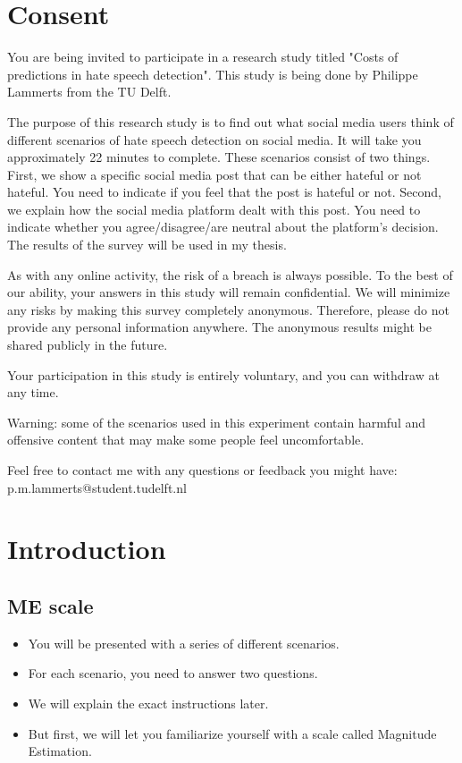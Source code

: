 \section{Consent}
\begin{flushleft}
    You are being invited to participate in a research study titled "Costs of predictions in hate speech detection". This study is being done by Philippe Lammerts from the TU Delft.
\end{flushleft}
\begin{flushleft}
    The purpose of this research study is to find out what social media users think of different scenarios of hate speech detection on social media. It will take you approximately 22 minutes to complete. These scenarios consist of two things. First, we show a specific social media post that can be either hateful or not hateful. You need to indicate if you feel that the post is hateful or not. Second,  we explain how the social media platform dealt with this post. You need to indicate whether you agree/disagree/are neutral about the platform's decision. The results of the survey will be used in my thesis.
\end{flushleft}
\begin{flushleft}
    As with any online activity, the risk of a breach is always possible. To the best of our ability, your answers in this study will remain confidential. We will minimize any risks by making this survey completely anonymous. Therefore, please do not provide any personal information anywhere. The anonymous results might be shared publicly in the future.
\end{flushleft}
\begin{flushleft}
    Your participation in this study is entirely voluntary, and you can withdraw at any time.
\end{flushleft}
\begin{flushleft}
    Warning: some of the scenarios used in this experiment contain harmful and offensive content that may make some people feel uncomfortable.
\end{flushleft}
\begin{flushleft}
    Feel free to contact me with any questions or feedback you might have:
    p.m.lammerts@student.tudelft.nl
\end{flushleft}

\section{Introduction}
\subsection{ME scale}
\begin{itemize}
    \item You will be presented with a series of different scenarios.
    \item For each scenario, you need to answer two questions.
    \item We will explain the exact instructions later.
    \item But first, we will let you familiarize yourself with a scale called Magnitude Estimation.
\end{itemize}

